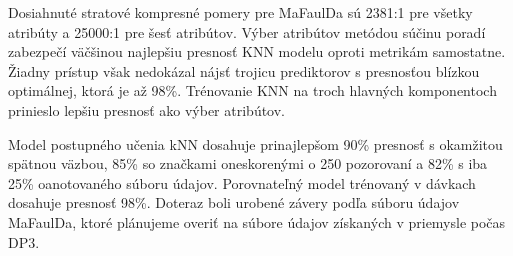 Dosiahnuté stratové kompresné pomery pre MaFaulDa sú 2381:1 pre všetky atribúty a 25000:1 pre šesť atribútov. Výber atribútov metódou súčinu poradí zabezpečí väčšinou najlepšiu presnosť KNN modelu oproti metrikám samostatne. Žiadny prístup však nedokázal nájsť trojicu prediktorov s presnosťou blízkou optimálnej, ktorá je až 98\%. Trénovanie KNN na troch hlavných komponentoch prinieslo lepšiu presnosť ako výber atribútov. 

Model postupného učenia kNN dosahuje prinajlepšom 90\% presnosť s okamžitou spätnou väzbou, 85\% so značkami oneskorenými o 250 pozorovaní a 82\% s iba 25\% oanotovaného súboru údajov. Porovnateľný model trénovaný v dávkach dosahuje presnosť 98\%.  Doteraz boli urobené závery podľa súboru údajov MaFaulDa, ktoré plánujeme overiť na súbore údajov získaných v priemysle počas DP3.

\clearpage
